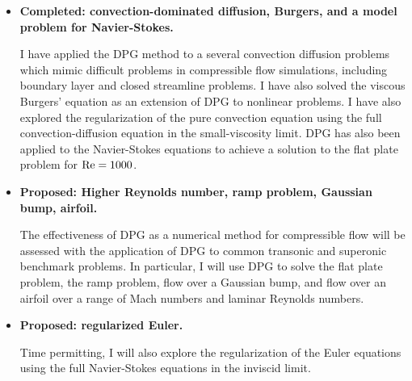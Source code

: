 \begin{itemize}
\item{\textbf{Completed: convection-dominated diffusion, Burgers, and a model problem for Navier-Stokes.}} 

I have applied the DPG method to a several convection diffusion problems which mimic difficult problems in compressible flow simulations, including boundary layer and closed streamline problems.  I have also solved the viscous Burgers' equation as an extension of DPG to nonlinear problems. I have also explored the regularization of the pure convection equation using the full convection-diffusion equation in the small-viscosity limit. DPG has also been applied to the Navier-Stokes equations to achieve a solution to the flat plate problem for $\Reyn = 1000$.

\item{\textbf{Proposed: Higher Reynolds number, ramp problem, Gaussian bump, airfoil.}}

The effectiveness of DPG as a numerical method for compressible flow will be assessed with the application of DPG to common transonic and superonic benchmark problems.  In particular, I will use DPG to solve the flat plate problem, the ramp problem, flow over a Gaussian bump, and flow over an airfoil over a range of Mach numbers and laminar Reynolds numbers. 

\item{\textbf{Proposed: regularized Euler.}}

Time permitting, I will also explore the regularization of the Euler equations using the full Navier-Stokes equations in the inviscid limit.

\end{itemize}
